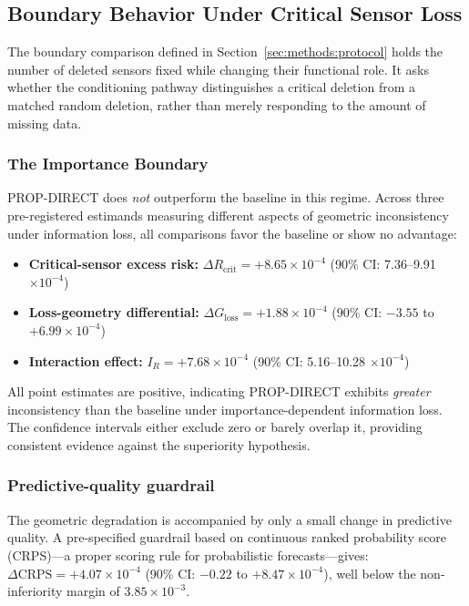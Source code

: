 \subsection{Boundary Behavior Under Critical Sensor Loss}
\label{sec:results:boundary}

The boundary comparison defined in Section~\ref{sec:methods:protocol} holds the
number of deleted sensors fixed while changing their functional role. It asks
whether the conditioning pathway distinguishes a critical deletion from a matched
random deletion, rather than merely responding to the amount of missing data.

\subsubsection{The Importance Boundary}

PROP-DIRECT does \emph{not} outperform the baseline in this regime. Across three pre-registered estimands measuring different aspects of geometric inconsistency under information loss, all comparisons favor the baseline or show no advantage:

\begin{itemize}
    \item \textbf{Critical-sensor excess risk:} $\Delta R_{\text{crit}} = +8.65 \times 10^{-4}$ (90\% CI: 7.36--9.91 $\times 10^{-4}$)
    \item \textbf{Loss-geometry differential:} $\Delta G_{\text{loss}} = +1.88 \times 10^{-4}$ (90\% CI: $-3.55$ to $+6.99 \times 10^{-4}$)
    \item \textbf{Interaction effect:} $I_R = +7.68 \times 10^{-4}$ (90\% CI: 5.16--10.28 $\times 10^{-4}$)
\end{itemize}

All point estimates are positive, indicating PROP-DIRECT exhibits \emph{greater} inconsistency than the baseline under importance-dependent information loss. The confidence intervals either exclude zero or barely overlap it, providing consistent evidence against the superiority hypothesis.

\subsubsection{Predictive-quality guardrail}

The geometric degradation is accompanied by only a small change in predictive quality. A pre-specified guardrail based on continuous ranked probability score (CRPS)---a proper scoring rule for probabilistic forecasts---gives: $\Delta \text{CRPS} = +4.07 \times 10^{-4}$ (90\% CI: $-0.22$ to $+8.47 \times 10^{-4}$), well below the non-inferiority margin of $3.85 \times 10^{-3}$.

